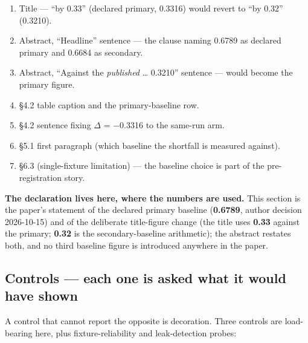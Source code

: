 \documentclass[11pt,a4paper]{article}
\begin{document}
\begin{enumerate}
\item Title --- ``by 0.33'' (declared primary, 0.3316) would revert to ``by 0.32'' (0.3210).
\item Abstract, ``Headline'' sentence --- the clause naming 0.6789 as declared primary and 0.6684 as secondary.
\item Abstract, ``Against the \emph{published} \ldots{} 0.3210'' sentence --- would become the primary figure.
\item \S4.2 table caption and the primary-baseline row.
\item \S4.2 sentence fixing $\Delta$ = $-$0.3316 to the same-run arm.
\item \S5.1 first paragraph (which baseline the shortfall is measured against).
\item \S6.3 (single-fixture limitation) --- the baseline choice is part of the pre-registration story.
\end{enumerate}

\textbf{The declaration lives here, where the numbers are used.} This section is the paper's statement of the declared primary baseline (\textbf{0.6789}, author decision 2026-10-15) and of the deliberate title-figure change (the title uses \textbf{0.33} against the primary; \textbf{0.32} is the secondary-baseline arithmetic); the abstract restates both, and no third baseline figure is introduced anywhere in the paper.

\subsection{Controls --- each one is asked what it would have shown}

A control that cannot report the opposite is decoration. Three controls are load-bearing here, plus fixture-reliability and leak-detection probes:
\end{document}
